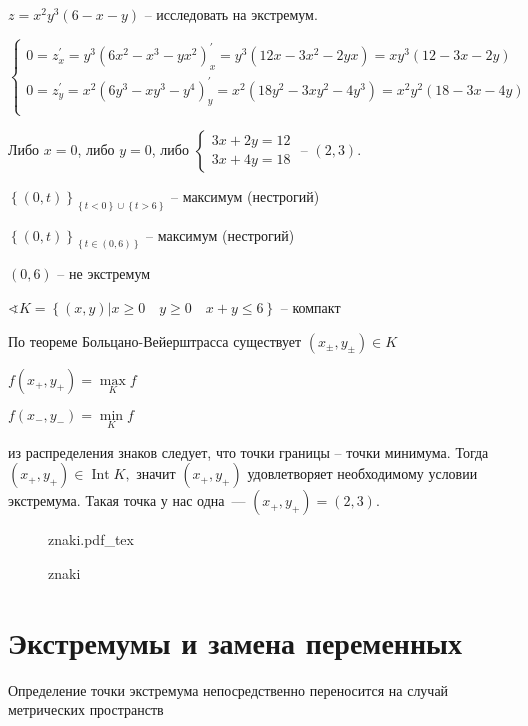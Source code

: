 \documentclass{book}
\newcommand{\p}[1]{#1^{\prime}}
\theoremstyle{definition}
\newcommand{\incfig}[1]{%
    \def\svgwidth{\columnwidth}
    {#1.pdf_tex}
}
\DeclareMathOperator{\Int}{Int}
\begin{document}
        \begin{problem}
            $z = x^2y^3(6-x-y)$ -- исследовать на экстремум. 

            $\begin{cases}
                0 = \p z_x = y^3(6x^2-x^3-yx^2\p )_x = y^3(12x-3x^2-2yx) = xy^3(12-3x-2y)\\
                0 = \p z_y = x^2(6y^3-xy^3-y^4 \p )_y = x^2(18y^2-3xy^2-4y^3)= x^2y^2(18-3x-4y)\\
            \end{cases}$ 

           Либо $x=0$, либо  $y=0$, либо  $\begin{cases}
               3x + 2y = 12\\ 3x+4y=18
           \end{cases}$ -- $(2, 3)$.

$\left\{ (0, t) \right\} _{\left\{ t<0 \right\} \cup \left\{ t>6 \right\} }$ -- максимум (нестрогий)

$\left\{ (0, t) \right\} _{\left\{ t\in (0,6) \right\} }$ -- максимум (нестрогий)

$(0,6)$ -- не экстремум

$\sphericalangle K = \left\{ (x, y)|x\geqslant 0\quad y\geqslant 0\quad x+y\leqslant 6 \right\} $ -- компакт

По теореме Больцано-Вейерштрасса существует $\left( x_{\pm}, y_{\pm} \right)\in K $ 

$f\left( x_+, y_+ \right)  = \max\limits_K f$

$f\left(x_-, y_-  \right) = \min\limits_Kf $ 

из распределения знаков следует, что точки границы -- точки минимума.
Тогда $(x_+, y_+)\in \Int K,$ значит $(x_+, y_+)$ удовлетворяет необходимому условии экстремума. 
Такая точка у нас одна~---  $(x_+, y_+) = (2, 3)$.
        \end{problem}

\begin{figure}[!ht]
    \centering
    \incfig{znaki}
    \caption{znaki}
    \label{fig:znaki}
\end{figure}
        \section{Экстремумы и замена переменных}
        Определение точки экстремума непосредственно переносится на случай метрических пространств
\end{document}

